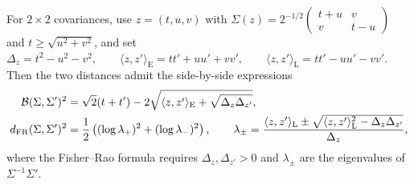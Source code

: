 For $2\times2$ covariances, use $z=(t,u,v)$ with $\Sigma(z)=2^{-1/2}\left(\begin{smallmatrix}t+u&v\\v&t-u\end{smallmatrix}\right)$ and $t\geq\sqrt{u^2+v^2}$, and set
\(\Delta_z=t^2-u^2-v^2,\qquad \langle z,z'\rangle_{\mathrm E}=tt'+uu'+vv', \qquad \langle z,z'\rangle_{\mathrm L}=tt'-uu'-vv'.\)
Then the two distances admit the side-by-side expressions
\begin{align}
\mathcal{B}(\Sigma,\Sigma')^2
&=
\sqrt2(t+t')
-2\sqrt{\langle z,z'\rangle_{\mathrm E}
+\sqrt{\Delta_z\Delta_{z'}}},
\label{eq-2x2-bures-cone-distance}\\
d_{\mathrm{FR}}(\Sigma,\Sigma')^2
&=
\frac12\left((\log\lambda_+)^2+(\log\lambda_-)^2\right),
\qquad
\lambda_\pm
=
\frac{\langle z,z'\rangle_{\mathrm L}
\pm\sqrt{\langle z,z'\rangle_{\mathrm L}^2-\Delta_z\Delta_{z'}}}
{\Delta_z},
\label{eq-2x2-fr-cone-distance}
\end{align}
where the Fisher--Rao formula requires $\Delta_z,\Delta_{z'}>0$ and $\lambda_\pm$ are the eigenvalues of $\Sigma^{-1}\Sigma'$.
